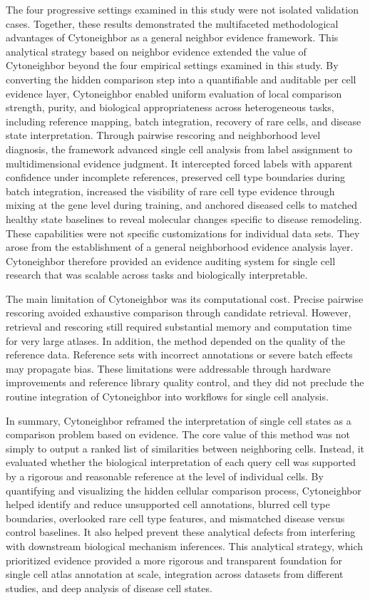 \documentclass[11pt]{article}
\begin{document}
The four progressive settings examined in this study were not isolated validation cases. Together, these results demonstrated the multifaceted methodological advantages of Cytoneighbor as a general neighbor evidence framework. This analytical strategy based on neighbor evidence extended the value of Cytoneighbor beyond the four empirical settings examined in this study. By converting the hidden comparison step into a quantifiable and auditable per cell evidence layer, Cytoneighbor enabled uniform evaluation of local comparison strength, purity, and biological appropriateness across heterogeneous tasks, including reference mapping, batch integration, recovery of rare cells, and disease state interpretation. Through pairwise rescoring and neighborhood level diagnosis, the framework advanced single cell analysis from label assignment to multidimensional evidence judgment. It intercepted forced labels with apparent confidence under incomplete references, preserved cell type boundaries during batch integration, increased the visibility of rare cell type evidence through mixing at the gene level during training, and anchored diseased cells to matched healthy state baselines to reveal molecular changes specific to disease remodeling. These capabilities were not specific customizations for individual data sets. They arose from the establishment of a general neighborhood evidence analysis layer. Cytoneighbor therefore provided an evidence auditing system for single cell research that was scalable across tasks and biologically interpretable.

The main limitation of Cytoneighbor was its computational cost. Precise pairwise rescoring avoided exhaustive comparison through candidate retrieval. However, retrieval and rescoring still required substantial memory and computation time for very large atlases. In addition, the method depended on the quality of the reference data. Reference sets with incorrect annotations or severe batch effects may propagate bias. These limitations were addressable through hardware improvements and reference library quality control, and they did not preclude the routine integration of Cytoneighbor into workflows for single cell analysis.

In summary, Cytoneighbor reframed the interpretation of single cell states as a comparison problem based on evidence. The core value of this method was not simply to output a ranked list of similarities between neighboring cells. Instead, it evaluated whether the biological interpretation of each query cell was supported by a rigorous and reasonable reference at the level of individual cells. By quantifying and visualizing the hidden cellular comparison process, Cytoneighbor helped identify and reduce unsupported cell annotations, blurred cell type boundaries, overlooked rare cell type features, and mismatched disease versus control baselines. It also helped prevent these analytical defects from interfering with downstream biological mechanism inferences. This analytical strategy, which prioritized evidence provided a more rigorous and transparent foundation for single cell atlas annotation at scale, integration across datasets from different studies, and deep analysis of disease cell states.
\end{document}

